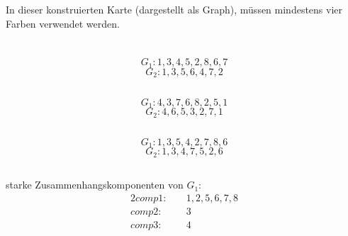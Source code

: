 \documentclass[10pt,a4paper,oneside,ngerman,numbers=noenddot]{scrartcl}
\begin{document}
		\subsubsection{} %
			
			In dieser konstruierten Karte (dargestellt als Graph), müssen mindestens vier Farben verwendet werden.
\section{} %
	\subsection{} %
		\[
			G_{1}: 1, 3, 4, 5, 2, 8, 6, 7
		\]
		\[
			G_{2}: 1, 3, 5, 6, 4, 7, 2
		\]
	\subsection{} %
		\[
			G_{1}: 4, 3, 7, 6, 8, 2, 5, 1
		\]
		\[
			G_{2}: 4, 6, 5, 3, 2, 7, 1
		\]
	\subsection{} %
		\[
			G_{1}: 1, 3, 5, 4, 2, 7, 8, 6
		\]
		\[
			G_{2}: 1, 3, 4, 7, 5, 2, 6
		\]
	\subsection{} %
	\subsection{} %
	\subsection{} %
		starke Zusammenhangskomponenten von $G_{1}:$
		\begin{alignat*}{2}
			comp1:&&\; 1, 2, 5, 6, 7, 8 \\
			comp2:&&\; 3 \\
			comp3:&&\; 4
		\end{alignat*}
		
\end{document}
